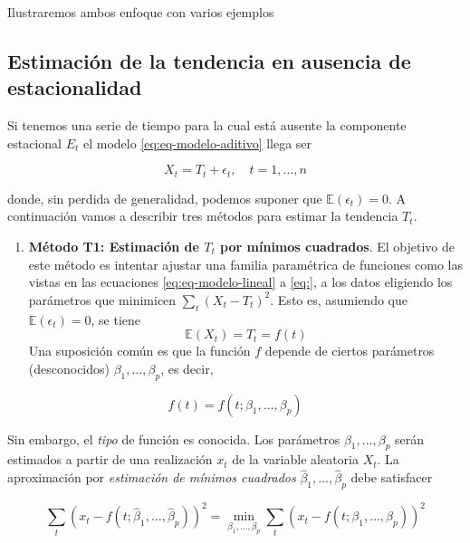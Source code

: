 \documentclass[12pt,]{krantz}
\providecommand{\tightlist}{%
  \setlength{\itemsep}{0pt}\setlength{\parskip}{0pt}}
\theoremstyle{definition}
\theoremstyle{definition}
\theoremstyle{definition}
\theoremstyle{remark}
\begin{document}
Ilustraremos ambos enfoque con varios ejemplos

\subsection{Estimación de la tendencia en ausencia de
estacionalidad}\label{estimacion-de-la-tendencia-en-ausencia-de-estacionalidad}

Si tenemos una serie de tiempo para la cual está ausente la componente
estacional \(E_t\) el modelo \eqref{eq:eq-modelo-aditivo} llega ser

\begin{equation}
X_t = T_t + \epsilon_t,\quad t=1,\ldots,n
\label{eq:eq-modelo-tendencia}
\end{equation}

donde, sin perdida de generalidad, podemos suponer que
\(\mathbb{E}(\epsilon_t)=0\). A continuación vamos a describir tres
métodos para estimar la tendencia \(T_t\).

\begin{enumerate}
\def\labelenumi{\arabic{enumi}.}
\tightlist
\item
  \textbf{Método T1: Estimación de \(T_t\) por mínimos cuadrados}. El
  objetivo de este método es intentar ajustar una familia paramétrica de
  funciones como las vistas en las ecuaciones \eqref{eq:eq-modelo-lineal}
  a \ref{eq:}, a los datos eligiendo los parámetros que minimicen
  \(\sum_t(X_t-T_t)^2\). Esto es, asumiendo que
  \(\mathbb{E}(\epsilon_t)=0\), se tiene \[\mathbb{E}(X_t)=T_t=f(t)\]
  Una suposición común es que la función \(f\) depende de ciertos
  parámetros (desconocidos) \(\beta_1,\ldots,\beta_p\), es decir,
\end{enumerate}

\begin{equation}
f(t)=f(t;\beta_1,\ldots,\beta_p)
\label{eq:eq-funcion-parametros-metodo-T1}
\end{equation}

Sin embargo, el \emph{tipo} de función es conocida. Los parámetros
\(\beta_1,\ldots,\beta_p\) serán estimados a partir de una realización
\(x_t\) de la variable aleatoria \(X_t\). La aproximación por
\emph{estimación de mínimos cuadrados}
\(\hat{\beta}_1,\ldots,\hat{\beta}_p\) debe satisfacer

\begin{equation}
\sum_t(x_t-f(t;\hat{\beta}_1,\ldots,\hat{\beta}_p))^2 = \min_{\beta_1,\ldots,\beta_p}\sum_t(x_t-f(t;\beta_1,\ldots,\beta_p))^2
\label{eq:ecuacion-minimos-cuadrados-T1}
\end{equation}
\end{document}
